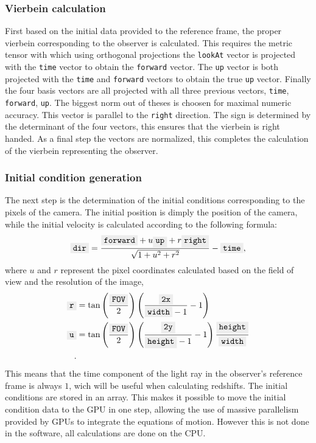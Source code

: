 \documentclass[pdftex,12pt,a4paper]{article}
\newcommand{\ctexttt}[1]{\colorbox{cverbbg}{\texttt{#1}}}
\begin{document}
	\subsubsection{Vierbein calculation}
		First based on the initial data provided to the reference frame, the proper vierbein corresponding to the observer is calculated. This requires the metric tensor with which using orthogonal projections the \ctexttt{lookAt} vector is projected with the \ctexttt{time} vector to obtain the \ctexttt{forward} vector. The \ctexttt{up} vector is both projected with the \ctexttt{time} and \ctexttt{forward} vectors to obtain the true \ctexttt{up} vector. Finally the four basis vectors are all projected with all three previous vectors, \ctexttt{time}, \ctexttt{forward}, \ctexttt{up}. The biggest norm out of theses is choosen for maximal numeric accuracy. This vector is parallel to the \ctexttt{right} direction. The sign is determined by the determinant of the four vectors, this ensures that the vierbein is right handed. As a final step the vectors are normalized, this completes the calculation of the vierbein representing the observer.
	\subsubsection{Initial condition generation}
		The next step is the determination of the initial conditions corresponding to the pixels of the camera. The initial position is dimply the position of the camera, while the initial velocity is calculated according to the following formula:
		\begin{equation}
			\ctexttt{dir} = \frac{\ctexttt{forward} + u\ctexttt{up} + r\ctexttt{right}}{\sqrt{1 + u^2 + r^2}} - \ctexttt{time},
		\end{equation}
		where $u$ and $r$ represent the pixel coordinates calculated based on the field of view and the resolution of the image,
		\begin{equation}
		\begin{aligned}
			\ctexttt{r} &= \tan\left(\frac{\ctexttt{FOV}}{2}\right)\left(\frac{\ctexttt{2x}}{\ctexttt{width} - 1} - 1\right)\\
			\ctexttt{u} &= \tan\left(\frac{\ctexttt{FOV}}{2}\right)\left(\frac{\ctexttt{2y}}{\ctexttt{height} - 1} - 1\right)\frac{\ctexttt{height}}{\ctexttt{width}}\\.
		\end{aligned}
		\end{equation}
		This means that the time component of the light ray in the observer's reference frame is always $1$, wich will be useful when calculating redshifts. The initial conditions are stored in an array. This makes it possible to move the initial condition data to the GPU in one step, allowing the use of massive parallelism provided by GPUs to integrate the equations of motion. However this is not done in the software, all calculations are done on the CPU.
\end{document}
